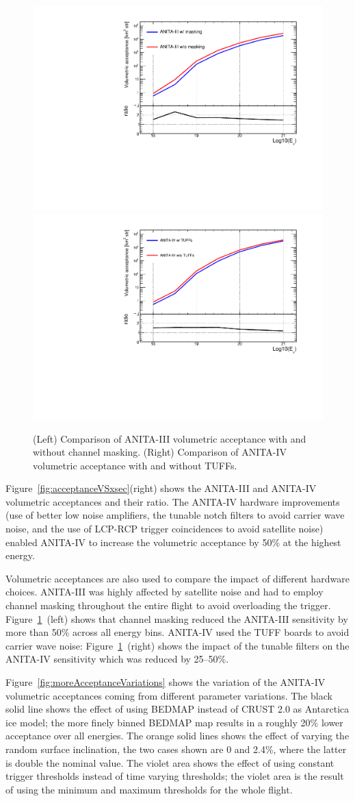 \begin{figure}[!h]\centering
  \includegraphics[width=.45\linewidth]{./Figs/CompareEffVol_A3masking.pdf}
  \includegraphics[width=.45\linewidth]{./Figs/CompareEffVol_A4tuff.pdf}
  \caption{(Left) Comparison of ANITA-III volumetric acceptance with and without channel masking.
  (Right) Comparison of ANITA-IV volumetric acceptance with and without TUFFs.}
  \label{fig:acceptanceVariations}
\end{figure}

Figure~\ref{fig:acceptanceVSxsec}(right) shows the ANITA-III and ANITA-IV volumetric acceptances and their ratio.
The ANITA-IV hardware improvements (use of better low noise
amplifiers, the tunable notch filters to avoid carrier wave noise, and
the use of LCP-RCP trigger coincidences to avoid satellite noise) 
enabled ANITA-IV to increase the volumetric acceptance by 50\% at the
highest energy.

Volumetric acceptances are also used to compare the impact of different hardware choices.
ANITA-III was highly affected by satellite noise and had to employ channel masking throughout the entire flight to avoid overloading the trigger. Figure~\ref{fig:acceptanceVariations}~(left) shows that channel masking reduced the ANITA-III sensitivity by more than 50\% across all energy bins.
ANITA-IV used the TUFF boards to avoid carrier wave noise: Figure~\ref{fig:acceptanceVariations}~(right) shows the impact of the tunable filters on the ANITA-IV sensitivity which was reduced by 25--50\%.

Figure~\ref{fig:moreAcceptanceVariations} shows the variation of the ANITA-IV volumetric acceptances coming from different \icemc parameter variations.
The black solid line shows the effect of using BEDMAP instead of CRUST 2.0 as Antarctica ice model; the more finely binned BEDMAP map results in a roughly 20\% lower acceptance over all energies.
The orange solid lines shows the effect of varying the random surface inclination, the two cases shown are 0 and 2.4\%, where the latter is double the nominal value.
The violet area shows the effect of using constant trigger thresholds instead of time varying thresholds; the violet area is the result of using the minimum and maximum thresholds for the whole flight.

